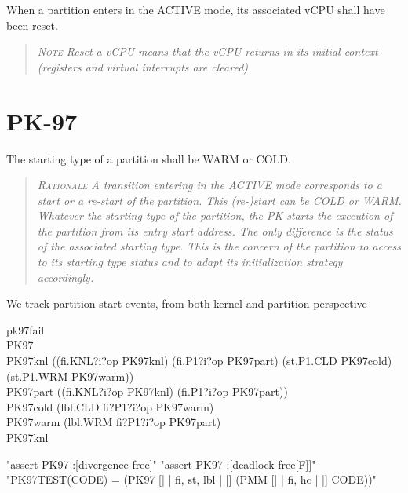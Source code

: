 When a partition enters in the ACTIVE mode,  its associated vCPU shall have been reset.
\begin{quote}\it
\textsc{Note}
Reset a vCPU means that the vCPU returns in its initial context (registers and virtual interrupts are cleared).
\end{quote}


\section{PK-97}

The starting type of a partition shall be WARM or COLD.
\begin{quote}\it
\textsc{Rationale}
A transition entering in the ACTIVE mode corresponds to
a start or a re-start of the partition.
This (re-)start can be COLD or WARM.
Whatever the starting type of the partition,
the PK starts the execution of the partition from its entry start address.
The only difference is the status of the associated starting type.
This is the concern of the partition to access to its starting type status
and to adapt its initialization strategy accordingly.
\end{quote}


 We track partition start events, from both kernel and partition perspective

\begin{circus}
\circchannel pk97fail\\

\circprocess PK97 \circdef \circbegin\\

  PK97knl \circdef ((fi.KNL?i?op \then PK97knl)  %
     \extchoice (fi.P1?i?op \then PK97part)  %
     \extchoice (st.P1.CLD \then PK97cold)
     \extchoice (st.P1.WRM \then PK97warm))\\

  PK97part \circdef ((fi.KNL?i?op \then PK97knl)  %
     \extchoice (fi.P1?i?op \then PK97part))\\  %

  PK97cold \circdef (lbl.CLD \then fi?P1?i?op \then PK97warm)\\ %

  PK97warm \circdef (lbl.WRM \then fi?P1?i?op \then PK97part)\\ %

  \circspot PK97knl\\ %
  \circend
\end{circus}
\begin{assert}
"assert PK97 :[divergence free]"
\also "assert PK97 :[deadlock free[F]]"
\also "PK97TEST(CODE) = (PK97 [| {| fi, st, lbl |} |] (PMM [| {| fi, hc |} |] CODE))"
\end{assert}
